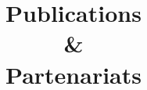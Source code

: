 \documentclass[french,11pt]{dibiso/pubpart}
\title{Publications \\ \& \\ Partenariats}
\subtitle{\textbf{\ifdefined\tuttiCfgEntitiesAcronym\tuttiCfgEntitiesAcronym\fi} \\
  \medskip
  \ifdefined\tuttiCfgEntitiesFullName\tuttiCfgEntitiesFullName\fi}
\date{\tuttiCfgYear}
\date{}
\begin{document}
\renewcommand{\arraystretch}{2}
\maketitle
\tableofcontents
\clearpage

\makelastpagereport
\end{document}
